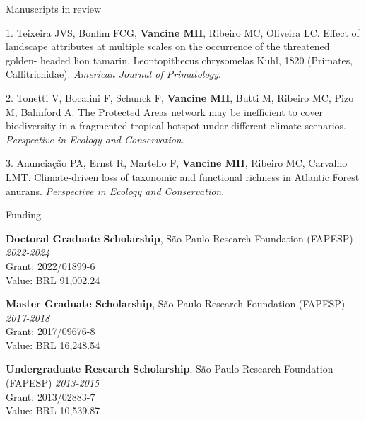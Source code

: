 \documentclass{resume}
\begin{document}

\begin{rSection}{Manuscripts in review}

1. Teixeira JVS, Bonfim FCG, {\bf Vancine MH}, Ribeiro MC, Oliveira LC. Effect
of landscape attributes at multiple scales on the occurrence of the threatened golden-
headed lion tamarin, Leontopithecus chrysomelas Kuhl, 1820 (Primates, Callitrichidae).
{\it American Journal of Primatology}.

2. Tonetti V, Bocalini F, Schunck F, {\bf Vancine MH}, Butti M, Ribeiro MC, Pizo M,
Balmford A. The Protected Areas network may be inefficient to cover biodiversity in a
fragmented tropical hotspot under different climate scenarios. {\it Perspective in Ecology and
Conservation}.

3. Anunciação PA, Ernst R, Martello F, {\bf Vancine MH}, Ribeiro MC, Carvalho LMT. Climate-driven loss of taxonomic and functional richness in Atlantic Forest anurans. {\it Perspective in Ecology and Conservation}.

\end{rSection}


\begin{rSection}{Funding} 

{\bf Doctoral Graduate Scholarship}{, São Paulo Research Foundation (FAPESP)
} \hfill{\em 2022-2024} 
\\ Grant: \href{https://bv.fapesp.br/en/bolsas/203713/landscape-structure-as-a-predictor-of-taxonomic-and-functional-diversity-of-amphibians-in-the-atlant/}{\underline{2022/01899-6}} 
\\Value: BRL 91,002.24

{\bf Master Graduate Scholarship}{, São Paulo Research Foundation (FAPESP)
} \hfill{\em 2017-2018} 
\\ Grant: \href{https://bv.fapesp.br/en/bolsas/172826/effect-of-landscape-modifications-and-climate-changes-on-the-persistence-of-amphibians-in-the-atlant/}{\underline{2017/09676-8}} 
\\ Value: BRL 16,248.54

{\bf Undergraduate Research Scholarship}{, São Paulo Research Foundation (FAPESP)
} \hfill{\em 2013-2015} 
\\ Grant: \href{https://bv.fapesp.br/en/bolsas/142421/effect-of-fragmentation-on-the-persistence-of-anuran-amphibians-amphibia-anura-within-the-atlanti/}{\underline{2013/02883-7}} 
\\ Value: BRL 10,539.87

\end{rSection}
\end{document}
